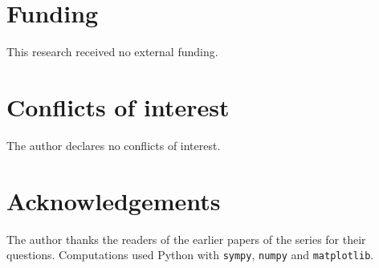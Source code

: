 \documentclass[11pt,a4paper]{article}
\theoremstyle{plain}
\theoremstyle{definition}
\theoremstyle{remark}
\begin{document}
\section*{Funding}
This research received no external funding.

\section*{Conflicts of interest}
The author declares no conflicts of interest.

\section*{Acknowledgements}
The author thanks the readers of the earlier papers of the series for their
questions. Computations used Python with \texttt{sympy}, \texttt{numpy} and
\texttt{matplotlib}.
\end{document}
